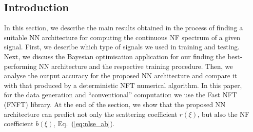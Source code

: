 \subsection{Introduction}
\label{sec:nn_nft_intro}

In this section, we describe the main results obtained in the process of finding a suitable NN architecture for computing the continuous NF spectrum of a given signal. 
First, we describe which type of signals we used in training and testing. Next, we discuss the Bayesian optimisation application for our finding the best-performing NN architecture and the respective training procedure. 
Then, we analyse the output accuracy for the proposed NN architecture and compare it with that produced by a deterministic NFT numerical algorithm.
In this paper, for the data generation and ``conventional'' computation we use the Fast NFT (FNFT) library\cite{FNFT2018}.
At the end of the section, we show that the proposed NN architecture can predict not only the scattering coefficient $r(\xi)$, but also the NF coefficient $b(\xi)$, Eq.~(\ref{eq:nlse_ab}).

